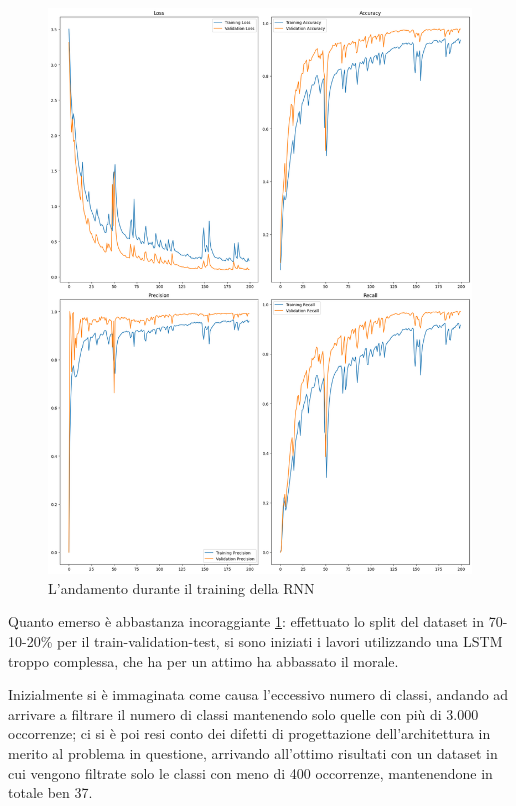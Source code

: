 \documentclass[conference]{IEEEtran}
\begin{document}
%
\begin{figure}[h]
    \centering
    \includegraphics[width=\columnwidth]{images/ESED/ESD_training_400.png}
    \caption{L'andamento durante il training della RNN}
    \label{fig:train-400-esed}
\end{figure}
%
Quanto emerso è abbastanza incoraggiante \ref{fig:train-400-esed}: effettuato lo split del dataset in 70-10-20\% per il train-validation-test, si sono iniziati i lavori utilizzando una LSTM troppo complessa, che ha per un attimo ha abbassato il morale. 

Inizialmente si è immaginata come causa l'eccessivo numero di classi, andando ad arrivare a filtrare il numero di classi mantenendo solo quelle con più di 3.000 occorrenze; ci si è poi resi conto dei difetti di progettazione dell'architettura in merito al problema in questione, arrivando all'ottimo risultati con un dataset in cui vengono filtrate solo le classi con meno di 400 occorrenze, mantenendone in totale ben 37. 
\end{document}

